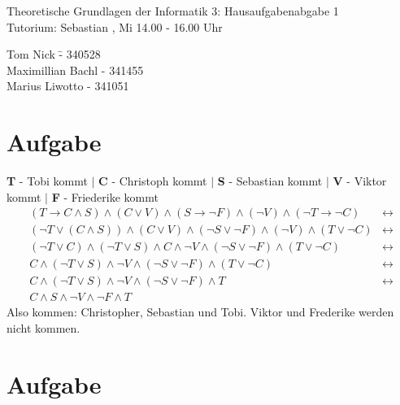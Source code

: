 \documentclass[a4paper,10pt]{scrartcl}
\author{}
\begin{document}
\begin{center}
\Large{Theoretische Grundlagen der Informatik 3: Hausaufgabenabgabe 1} \\
\large{Tutorium: Sebastian , Mi 14.00 - 16.00 Uhr}
\end{center}
\begin{tabbing}
Tom Nick \hspace{2cm}\= - 340528\\
Maximillian Bachl \> - 341455 \\
Marius Liwotto\> -  341051
\end{tabbing}

\section{Aufgabe}
\textbf{T} - Tobi kommt $\mid$
\textbf{C} - Christoph kommt $\mid$
\textbf{S} - Sebastian kommt $\mid$
\textbf{V} - Viktor kommt $\mid$
\textbf{F} - Friederike kommt
\begin{align*}
(T \to C \land S) \land
(C \lor V) \land
(S \to \lnot F) \land
(\lnot V) \land
(\lnot T \to \lnot C) &\leftrightarrow \\
(\lnot T \lor (C \land S)) \land
(C \lor V) \land
(\lnot S \lor \lnot F) \land
(\lnot V) \land
(T \lor \lnot C) &\leftrightarrow \\
(\lnot T \lor C) \land (\lnot T \lor S) \land
C \land \lnot V \land
(\lnot S \lor \lnot F) \land
(T \lor \lnot C) &\leftrightarrow \\
C \land (\lnot T \lor S) \land
\lnot V \land
(\lnot S \lor \lnot F) \land
(T \lor \lnot C) &\leftrightarrow \\
C \land (\lnot T \lor S) \land
\lnot V \land
(\lnot S \lor \lnot F) \land
T &\leftrightarrow \\
C \land S \land
\lnot V \land
\lnot F \land
T
\end{align*}
Also kommen: Christopher, Sebastian und Tobi. Viktor und Frederike werden nicht kommen.
\section{Aufgabe}
\end{document}
